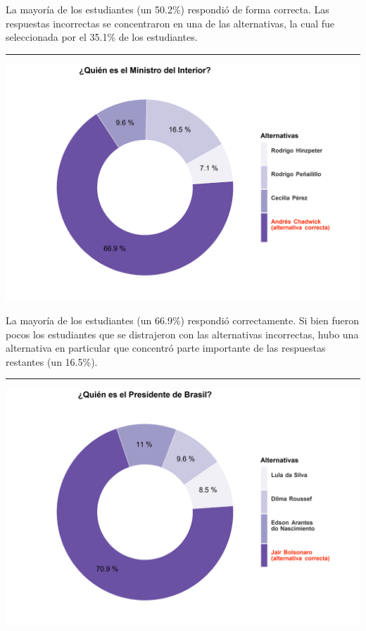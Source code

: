 \documentclass[
  14pt,
]{book}
\let\origfigure\figure
\let\endorigfigure\endfigure
\renewenvironment{figure}[1][2] {
  \expandafter\origfigure\expandafter[H]
} {
  \endorigfigure
}
\begin{document}
La mayoría de los estudiantes (un 50.2\%) respondió de forma correcta. Las respuestas incorrectas se concentraron en una de las alternativas, la cual fue seleccionada por el 35.1\% de los estudiantes.

\begin{center}\rule{0.5\linewidth}{0.5pt}\end{center}

\begin{figure}[!ht]

{\centering \includegraphics[width=0.8\linewidth,]{images/ccivico_11} 

}

\caption{Ministro del interior}\label{fig:unnamed-chunk-15}
\end{figure}

La mayoría de los estudiantes (un 66.9\%) respondió correctamente. Si bien fueron pocos los estudiantes que se distrajeron con las alternativas incorrectas, hubo una alternativa en particular que concentró parte importante de las respuestas restantes (un 16.5\%).

\begin{center}\rule{0.5\linewidth}{0.5pt}\end{center}

\begin{figure}[!ht]

{\centering \includegraphics[width=0.8\linewidth,]{images/ccivico_12} 

}

\caption{Presidente de Brasil}\label{fig:unnamed-chunk-16}
\end{figure}
\end{document}
